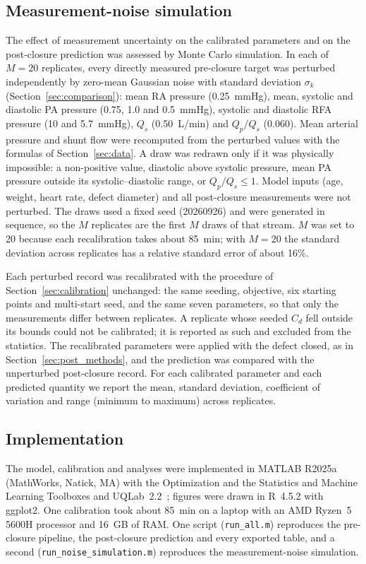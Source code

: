 \FloatBarrier
\subsection{Measurement-noise simulation}
\label{sec:noise_methods}
The effect of measurement uncertainty on the calibrated parameters and on the post-closure prediction was assessed by Monte Carlo simulation. In each of $M = 20$ replicates, every directly measured pre-closure target was perturbed independently by zero-mean Gaussian noise with standard deviation $\sigma_k$ (Section~\ref{sec:comparison}): mean RA pressure (0.25~mmHg), mean, systolic and diastolic PA pressure (0.75, 1.0 and 0.5~mmHg), systolic and diastolic RFA pressure (10 and 5.7~mmHg), $Q_s$ (0.50~L/min) and $Q_p/Q_s$ (0.060). Mean arterial pressure and shunt flow were recomputed from the perturbed values with the formulas of Section~\ref{sec:data}. A draw was redrawn only if it was physically impossible: a non-positive value, diastolic above systolic pressure, mean PA pressure outside its systolic--diastolic range, or $Q_p/Q_s \le 1$. Model inputs (age, weight, heart rate, defect diameter) and all post-closure measurements were not perturbed. The draws used a fixed seed (20260926) and were generated in sequence, so the $M$ replicates are the first $M$ draws of that stream. $M$ was set to 20 because each recalibration takes about 85~min; with $M = 20$ the standard deviation across replicates has a relative standard error of about 16\%.

Each perturbed record was recalibrated with the procedure of Section~\ref{sec:calibration} unchanged: the same seeding, objective, six starting points and multi-start seed, and the same seven parameters, so that only the measurements differ between replicates. A replicate whose seeded $C_d$ fell outside its bounds could not be calibrated; it is reported as such and excluded from the statistics. The recalibrated parameters were applied with the defect closed, as in Section~\ref{sec:post_methods}, and the prediction was compared with the unperturbed post-closure record. For each calibrated parameter and each predicted quantity we report the mean, standard deviation, coefficient of variation and range (minimum to maximum) across replicates.

\FloatBarrier
\subsection{Implementation}
The model, calibration and analyses were implemented in MATLAB R2025a (MathWorks, Natick, MA) with the Optimization and the Statistics and Machine Learning Toolboxes and UQLab~2.2~\cite{Marelli2014}; figures were drawn in R~4.5.2 with ggplot2. One calibration took about 85~min on a laptop with an AMD Ryzen~5 5600H processor and 16~GB of RAM. One script (\texttt{run\_all.m}) reproduces the pre-closure pipeline, the post-closure prediction and every exported table, and a second (\texttt{run\_noise\_simulation.m}) reproduces the measurement-noise simulation.

